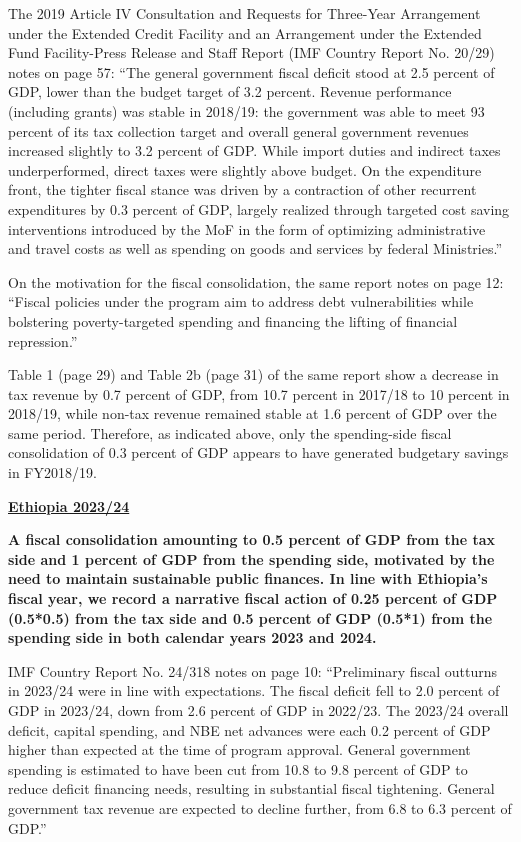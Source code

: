 The 2019 Article IV Consultation and Requests for Three-Year Arrangement under the Extended Credit Facility and an Arrangement under the Extended Fund Facility-Press Release and Staff Report (IMF Country Report No. 20/29) notes on page 57: “The general government fiscal deficit stood at 2.5 percent of GDP, lower than the budget target of 3.2 percent. Revenue performance (including grants) was stable in 2018/19: the government was able to meet 93 percent of its tax collection target and overall general government revenues increased slightly to 3.2 percent of GDP. While import duties and indirect taxes underperformed, direct taxes were slightly above budget. On the expenditure front, the tighter fiscal stance was driven by a contraction of other recurrent expenditures by 0.3 percent of GDP, largely realized through targeted cost saving interventions introduced by the MoF in the form of optimizing administrative and travel costs as well as spending on goods and services by federal Ministries.”

On the motivation for the fiscal consolidation, the same report notes on page 12: “Fiscal policies under the program aim to address debt vulnerabilities while bolstering poverty-targeted spending and financing the lifting of financial repression.”

Table 1 (page 29) and Table 2b (page 31) of the same report show a decrease in tax revenue by 0.7 percent of GDP, from 10.7 percent in 2017/18 to 10 percent in 2018/19, while non-tax revenue remained stable at 1.6 percent of GDP over the same period. Therefore, as indicated above, only the spending-side fiscal consolidation of 0.3 percent of GDP appears to have generated budgetary savings in FY2018/19.

\textbf{\underline{Ethiopia 2023/24}}

\textbf{A fiscal consolidation amounting to 0.5 percent of GDP from the tax side and 1 percent of GDP from the spending side, motivated by the need to maintain sustainable public finances. In line with Ethiopia’s fiscal year, we record a narrative fiscal action of 0.25 percent of GDP (0.5*0.5) from the tax side and 0.5 percent of GDP (0.5*1) from the spending side in both calendar years 2023 and 2024.}

IMF Country Report No. 24/318 notes on page 10: “Preliminary fiscal outturns in 2023/24 were in line with expectations. The fiscal deficit fell to 2.0 percent of GDP in 2023/24, down from 2.6 percent of GDP in 2022/23. The 2023/24 overall deficit, capital spending, and NBE net advances were each 0.2 percent of GDP higher than expected at the time of program approval. General government spending is estimated to have been cut from 10.8 to 9.8 percent of GDP to reduce deficit financing needs, resulting in substantial fiscal tightening. General government tax revenue are expected to decline further, from 6.8 to 6.3 percent of GDP.”

